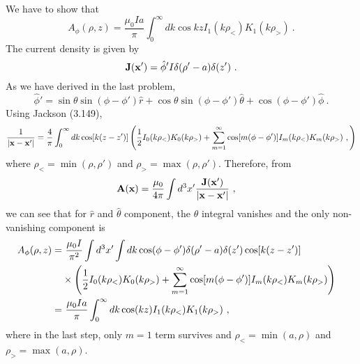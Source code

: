 \documentclass[12pt]{article}
\newcommand{\x}{{\bf x}}
\newcommand{\A}{{\bf A}}
\begin{document}
\newpage
{}
We have to show that
\begin{equation}
    A_\phi (\rho, z ) = \frac{\mu_0 I a}{\pi} \int_0^\infty dk \cos kz  I_1(k \rho_<) K_1(k \rho_>)~.
\end{equation}
The current density is given by
\begin{equation}
    {\bf J}(\x') = \hat{\phi}' I \delta(\rho'-a) \delta(z')~.
\end{equation}
As we have derived in the last problem,
\begin{equation}
    \hat{\phi}' = \sin \theta \sin(\phi - \phi') \hat{r} + \cos\theta \sin(\phi - \phi')\hat{\theta} + \cos(\phi - \phi') \hat{\phi}~.
\end{equation}
Using Jackson (3.149),
\begin{equation}\nonumber
    \frac{1}{|\x - \x'|} = \frac{4}{\pi} \int_0^\infty dk \cos[k(z-z')]
    \left(
        \frac{1}{2} I_0(k \rho_<) K_0(k \rho_>) + \sum_{m=1}^\infty  \cos[m(\phi - \phi')] I_m (k \rho_<) K_m(k \rho_>)~,
    \right)
\end{equation}
where $\rho_< = \min(\rho, \rho')$ and $\rho_> = \max(\rho, \rho')$.
Therefore, from
\begin{align}
    \A(\x)&= \frac{\mu_0}{4\pi} \int d^3 x' \frac{{\bf J}(\x')}{|\x - \x'|}~,
\end{align}
we can see that for $\hat{r}$ and $\hat{\theta}$ component, the $\theta$ integral vanishes and the only non-vanishing component is
\begin{align}
    A_\phi(\rho,z) =&~ \frac{\mu_0 I }{\pi^2} \int d^3 x' \int dk \cos(\phi - \phi') \delta(\rho' - a) \delta(z') \cos[k(z-z')]\cr
    &\times\left(
        \frac{1}{2} I_0(k \rho_<) K_0(k \rho_>) + \sum_{m=1}^\infty  \cos[m(\phi - \phi')] I_m (k \rho_<) K_m(k \rho_>)
    \right)\cr
    =&~ \frac{\mu_0 I a}{\pi} \int_0^\infty dk \cos(kz) I_1(k \rho_<) K_1(k \rho_>)~,
\end{align}
where in the last step, only $m=1$ term survives and $\rho_<  = \min(a, \rho)$ and $\rho_> = \max(a, \rho)$.
\end{document}
